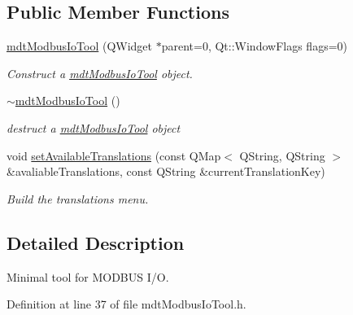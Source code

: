 \subsection*{Public Member Functions}
\begin{DoxyCompactItemize}
\item 
\hyperlink{classmdt_modbus_io_tool_a8ce66aaa36a5e1f5569eaf00f01f28c6}{mdtModbusIoTool} (QWidget $\ast$parent=0, Qt::WindowFlags flags=0)
\begin{DoxyCompactList}\small\item\em Construct a \hyperlink{classmdt_modbus_io_tool}{mdtModbusIoTool} object. \end{DoxyCompactList}\item 
\hypertarget{classmdt_modbus_io_tool_a4321c2d67a52e135dba99a053ef26547}{
\hyperlink{classmdt_modbus_io_tool_a4321c2d67a52e135dba99a053ef26547}{$\sim$mdtModbusIoTool} ()}
\label{classmdt_modbus_io_tool_a4321c2d67a52e135dba99a053ef26547}

\begin{DoxyCompactList}\small\item\em destruct a \hyperlink{classmdt_modbus_io_tool}{mdtModbusIoTool} object \end{DoxyCompactList}\item 
\hypertarget{classmdt_modbus_io_tool_a5609881a00e48c8cbd0047c3c6a15ff5}{
void \hyperlink{classmdt_modbus_io_tool_a5609881a00e48c8cbd0047c3c6a15ff5}{setAvailableTranslations} (const QMap$<$ QString, QString $>$ \&avaliableTranslations, const QString \&currentTranslationKey)}
\label{classmdt_modbus_io_tool_a5609881a00e48c8cbd0047c3c6a15ff5}

\begin{DoxyCompactList}\small\item\em Build the translations menu. \end{DoxyCompactList}\end{DoxyCompactItemize}


\subsection{Detailed Description}
Minimal tool for MODBUS I/O. 

Definition at line 37 of file mdtModbusIoTool.h.



